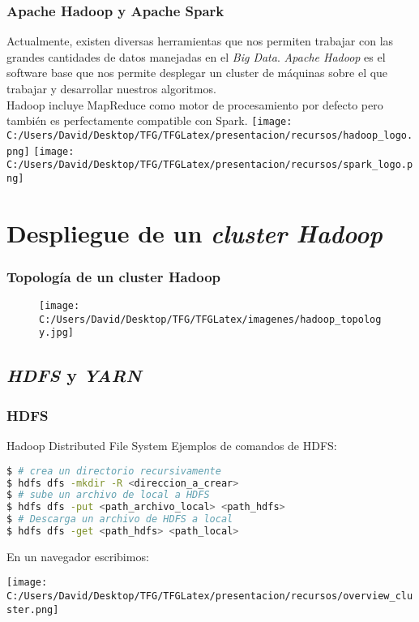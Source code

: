 \documentclass{beamer}
\begin{document}
\begin{frame} %
  \frametitle{Apache Hadoop y Apache Spark}
  Actualmente, existen diversas herramientas que nos permiten trabajar con las grandes cantidades de datos
  manejadas en el \textit{Big Data}. \textit{Apache Hadoop} es el software base que nos permite desplegar
  un cluster de máquinas sobre el que trabajar y desarrollar nuestros algoritmos.\\
  Hadoop incluye MapReduce como motor de procesamiento por defecto pero también es perfectamente compatible con Spark.
  \texttt{[image: C:/Users/David/Desktop/TFG/TFGLatex/presentacion/recursos/hadoop\_logo.png]}%
  \texttt{[image: C:/Users/David/Desktop/TFG/TFGLatex/presentacion/recursos/spark\_logo.png]}
\end{frame}

\section{Despliegue de un \textit{cluster Hadoop}}

\begin{frame} %
\frametitle{Topología de un cluster Hadoop}
\begin{figure}
\centering
\texttt{[image: C:/Users/David/Desktop/TFG/TFGLatex/imagenes/hadoop\_topology.jpg]}
\end{figure}
\end{frame}


\subsection{\textit{HDFS} y \textit{YARN}}

\begin{frame}[fragile] %
\frametitle{HDFS}
\begin{block}{Hadoop Distributed File System}
Ejemplos de comandos de HDFS:
\begin{lstlisting}[language=bash, numbers=none, frame=single]
$ # crea un directorio recursivamente
$ hdfs dfs -mkdir -R <direccion_a_crear>
$ # sube un archivo de local a HDFS
$ hdfs dfs -put <path_archivo_local> <path_hdfs> 
$ # Descarga un archivo de HDFS a local
$ hdfs dfs -get <path_hdfs> <path_local> 
\end{lstlisting}

En un navegador escribimos: 

\end{block}
\texttt{[image: C:/Users/David/Desktop/TFG/TFGLatex/presentacion/recursos/overview\_cluster.png]}
\end{frame}
\end{document}
